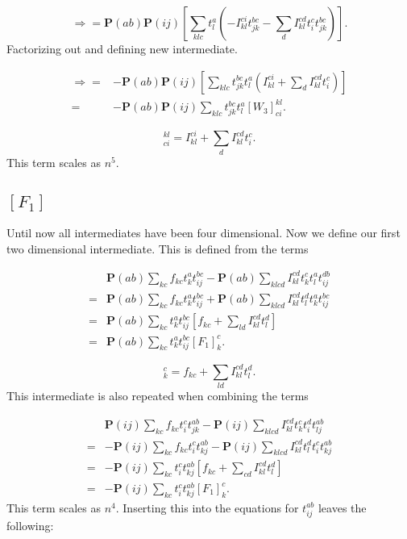 \begin{equation}
\Rightarrow =
\textbf{P}(ab) \textbf{P}(ij) \left[ \sum_{klc} t_l^a \left(
- I_{kl}^{ci} t_{jk}^{bc} - \sum_d I_{kl}^{cd} t_i^c t_{jk}^{bc} \right) \right] .
\end{equation}
Factorizing out and defining new intermediate.

\begin{align}
\Rightarrow = &
- \textbf{P}(ab) \textbf{P}(ij) \left[ \sum_{klc} t_{jk}^{bc} t_l^a \left(
 I_{kl}^{ci} + \sum_d I_{kl}^{cd} t_i^c \right) \right] \nonumber \\
= &
- \textbf{P}(ab) \textbf{P}(ij) \sum_{klc}
t_{jk}^{bc} t_l^a
 [W_3]_{ci}^{kl} .
\end{align}

\begin{equation}
[W_3]_{ci}^{kl} = I_{kl}^{ci} + \sum_d I_{kl}^{cd} t_i^c  . \label{intermedW3}
\end{equation}
This term scales as $n^5$.

\subsection{$[F_1]$}
Until now all intermediates have been four dimensional. Now we define our first two dimensional intermediate. This is defined from the terms

\begin{align}
& \textbf{P}(ab) \sum_{kc} f_{kc} t_k^a t_{ij}^{bc}
- \textbf{P}(ab) \sum_{klcd} I_{kl}^{cd} t_k^c t_l^a t_{ij}^{db} \nonumber \\ 
= & 
\textbf{P}(ab) \sum_{kc} f_{kc} t_k^a t_{ij}^{bc}
+ \textbf{P}(ab) \sum_{klcd} I_{kl}^{cd} t_l^d t_k^a t_{ij}^{bc} \nonumber \\
= &
\textbf{P}(ab) \sum_{kc} t_k^a t_{ij}^{bc} \left[ f_{kc} + \sum_{ld} I_{kl}^{cd} t_l^d \right] \nonumber \\
= &
\textbf{P}(ab) \sum_{kc} t_k^a t_{ij}^{bc} [F_1]_k^c .
\end{align}

\begin{equation}
[F_1]_k^c = f_{kc} + \sum_{ld} I_{kl}^{cd} t_l^d . \label{intermedF1}
\end{equation}
This intermediate is also repeated when combining the terms

\begin{align}
& \textbf{P}(ij) \sum_{kc} f_{kc} t_i^c t_{jk}^{ab}
- \textbf{P}(ij) \sum_{klcd} I_{kl}^{cd} t_k^c t_i^d t_{lj}^{ab} \nonumber \\ 
= &
- \textbf{P}(ij) \sum_{kc} f_{kc} t_i^c t_{kj}^{ab}
- \textbf{P}(ij) \sum_{klcd} I_{kl}^{cd} t_l^d t_i^c t_{kj}^{ab} \nonumber \\
= &
- \textbf{P}(ij) \sum_{kc} t_i^c t_{kj}^{ab} \left[
f_{kc} + \sum_{cd} I_{kl}^{cd} t_l^d \right] \nonumber \\ 
= &
- \textbf{P}(ij) \sum_{kc} t_i^c t_{kj}^{ab} [F_1]_k^c
.
\end{align}
This term scales as $n^4$. Inserting this into the equations for $t_{ij}^{ab}$ leaves the following:

